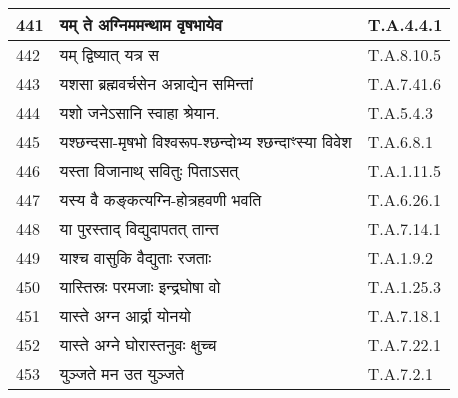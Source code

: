\documentclass[17pt]{extarticle}
\begin{document}
\begin{longtable}{||p{0.4in}||p{4.9in}||p{0.9in}||}
    441 & यम् ते अग्निममन्थाम वृषभायेव & T.A.4.4.1       \\
    
    \hline
        
    442 & यम् द्विष्यात् यत्र स & T.A.8.10.5       \\
    
    \hline
        
    443 & यशसा ब्रह्मवर्चसेन अन्नाद्येन समिन्तां & T.A.7.41.6       \\
    
    \hline
        
    444 & यशो जनेऽसानि स्वाहा श्रेयान. & T.A.5.4.3       \\
    
    \hline
        
    445 & यश्छन्दसा{-}मृषभो विश्वरूप{-}श्छन्दोभ्य श्छन्दाꣳस्या विवेश & T.A.6.8.1       \\
    
    \hline
        
    446 & यस्ता विजानाथ् सवितुः पिताऽसत् & T.A.1.11.5       \\
    
    \hline
        
    447 & यस्य वै कङ्कत्यग्नि{-}होत्रहवणी भवति & T.A.6.26.1       \\
    
    \hline
        
    448 & या पुरस्ताद् विद्युदापतत् तान्त & T.A.7.14.1       \\
    
    \hline
        
    449 & याश्च वासुकि वैद्युताः रजताः & T.A.1.9.2       \\
    
    \hline
        
    450 & यास्तिस्रः परमजाः इन्द्रघोषा वो & T.A.1.25.3       \\
    
    \hline
        
    451 & यास्ते अग्न आर्द्रा योनयो & T.A.7.18.1       \\
    
    \hline
        
    452 & यास्ते अग्ने घोरास्तनुवः क्षुच्च & T.A.7.22.1       \\
    
    \hline
        
    453 & युञ्जते मन उत युञ्जते & T.A.7.2.1       \\
    

\end{longtable}
\end{document}
